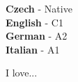 \documentclass[9pt]{cv}
\begin{document}
\begin{minipage}[t]{0.3\textwidth}
	\vspace{-\baselineskip} %


	\textbf{Czech} - Native\\
	\textbf{English} - C1\\
	\textbf{German} - A2\\
	\textbf{Italian} - A1\\
\end{minipage}
\hfill
\begin{minipage}[t]{0.3\textwidth}
	\vspace{-\baselineskip} %
	
	
	I love... \lorem
\end{minipage}
\hfill
% 	
% 	
\end{document}
